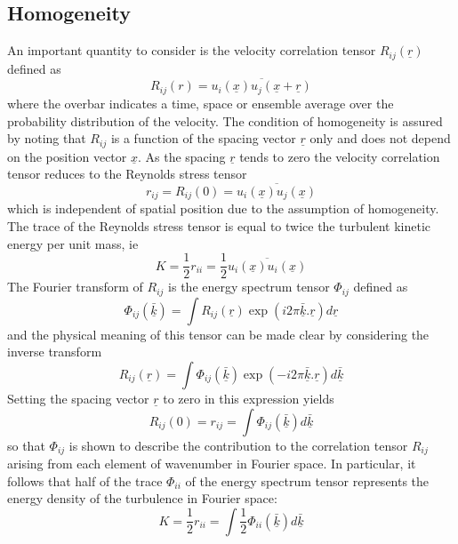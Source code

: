 \documentclass[dvips]{article}
\begin{document}
\subsection{Homogeneity}
An important quantity to consider is the velocity correlation
tensor $R_{ij}(\underline{r})$ defined as
\begin{equation} 
R_{ij}(r) = \overline{u_{i}(\underline{x})u_{j}(\underline{x}+\underline{r})}
\end{equation} 
where the overbar indicates a time, space or ensemble average over the
probability distribution of the velocity.  The condition
of homogeneity is assured by noting that $R_{ij}$ is a function of the
spacing vector $\underline{r}$ only and does not depend on the position vector
$\underline{x}$.  As the spacing $\underline{r}$ tends to zero the
velocity correlation tensor reduces to the Reynolds stress tensor
\begin{equation} 
r_{ij} = R_{ij}(0) = \overline{u_{i}(\underline{x})u_{j}(\underline{x})}
\end{equation} 
which is independent of spatial position due to the assumption of homogeneity.
The trace of the Reynolds stress tensor is equal to twice the turbulent kinetic
energy per unit mass, ie
\begin{equation}
K = \frac{1}{2}r_{ii}
= \frac{1}{2}\overline{u_{i}(\underline{x})u_{i}(\underline{x})}
\end{equation}
The Fourier transform of $R_{ij}$ is the energy
spectrum tensor $\Phi_{ij}$ defined as
\begin{equation}
\Phi_{ij}(\underline{\bar{k}}) = \int R_{ij}(\underline{r})
\exp{(i2\pi\underline{\bar{k}}.\underline{r})} d\underline{r}
\label{SPECTENS}
\end{equation}
and the physical meaning of this tensor can be made clear by considering the
inverse transform
\begin{equation}
R_{ij}(\underline{r}) = \int \Phi_{ij}(\underline{\bar{k}})
\exp{(-i2\pi\underline{\bar{k}}.\underline{r})} d\underline{\bar{k}}
\label{SPECTENSINV}
\end{equation}
Setting the spacing vector $\underline{r}$ to zero in this expression yields
\begin{equation}
R_{ij}(0) = r_{ij} = \int \Phi_{ij}(\underline{\bar{k}})
d\underline{\bar{k}}
\end{equation}
so that $\Phi_{ij}$ is shown to describe the contribution to the
correlation tensor $R_{ij}$
arising from each element of wavenumber in Fourier space.  In particular,
it follows that half of the trace $\Phi_{ii}$ of the energy spectrum
tensor represents the energy density of the turbulence in Fourier space:
\begin{equation}
K = \frac{1}{2}r_{ii} = \int \frac{1}{2}\Phi_{ii}(\underline{\bar{k}})
d\underline{\bar{k}}
\label{TKE}
\end{equation}
 
\end{document}
